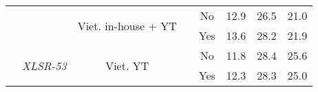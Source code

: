 \begin{table}[!ht]
\begin{adjustbox}{width=0.8\columnwidth,center}
\begin{tabular}{|c|c|c|c|c|c|c|c|}
\cline{3-3}\cline{5-8}
                                   &                                   & \multirow{2}{*}{Viet. in-house + YT} &                       & No                        & 12.9   & 26.5    & 21.0        \\ 
\cline{5-8}
                                   &                                   &                                      &                       & Yes                       & 13.6   & 28.2    & 21.9        \\ 
\cline{2-3}\cline{5-8}
                                   & \multirow{2}{*}{\textit{XLSR-53}} & \multirow{2}{*}{Viet. YT}            &                       & No                        & 11.8   & 28.4    & 25.6        \\ 
\cline{5-8}
                                   &                                   &                                      &                       & Yes                       & 12.3   & 28.3    & 25.0        \\
\hline
\end{tabular}
\end{adjustbox}
\caption{
    }
\label{int_loss_cvvivos_neg}
\end{table}